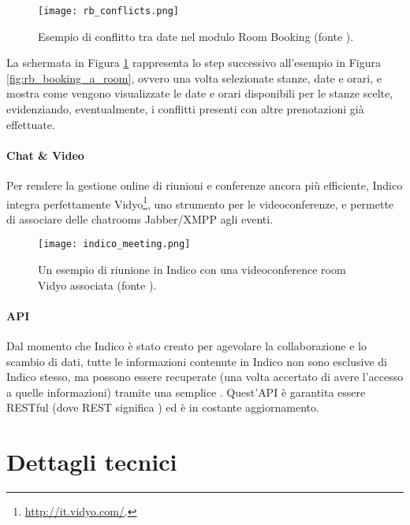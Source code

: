 		\begin{figure}[h!]
			\begin{center}
				\texttt{[image: rb\_conflicts.png]}
			\end{center}
			\caption[Conflitto di date con Room Booking]{Esempio di conflitto tra date nel modulo Room Booking (fonte \cite{indico:user_guide_1.9.6}).}
			\label{fig:rb_conflicts}
		\end{figure}
		
		La schermata in Figura \ref{fig:rb_conflicts} rappresenta lo step successivo all'esempio in Figura \ref{fig:rb_booking_a_room}, ovvero una volta selezionate stanze, date e orari, e mostra come vengono visualizzate le date e orari disponibili per le stanze scelte, evidenziando, eventualmente, i conflitti presenti con altre prenotazioni già effettuate.
		
		\paragraph{Chat \& Video}Per rendere la gestione online di riunioni e conferenze ancora più efficiente, Indico integra perfettamente Vidyo\footnote{\url{http://it.vidyo.com/}.}, uno strumento per le videoconferenze, e permette di associare delle chatrooms Jabber/XMPP agli eventi.

		\begin{figure}[h!]
			\begin{center}
				\texttt{[image: indico\_meeting.png]}
			\end{center}
			\caption[Meeting in Indico (esempio)]{Un esempio di riunione in Indico con una videoconference room Vidyo associata (fonte \cite{indico:user_guide_1.9.6}).}
			\label{fig:indico_meeting}
		\end{figure}
		
		\paragraph{API}Dal momento che Indico è stato creato per agevolare la collaborazione e lo scambio di dati, tutte le informazioni contenute in Indico non sono esclusive di Indico stesso, ma possono essere recuperate (una volta accertato di avere l'accesso a quelle informazioni) tramite una semplice . Quest'\ac{API} è garantita essere RESTful  (dove \acs{REST} significa ) ed è in costante aggiornamento.
		
	\section{Dettagli tecnici} \label{sec:i;dettagli_tecnici}
	
